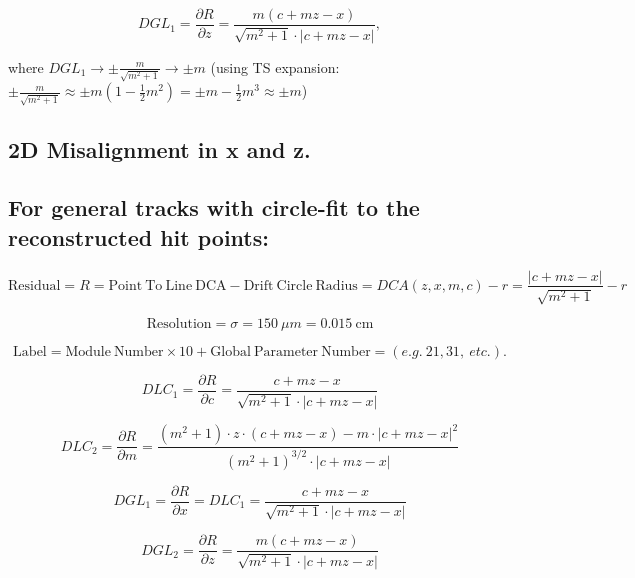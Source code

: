 \documentclass[a4paper,11pt]{article}
\begin{document}
\begin{equation}	
DGL_1 = \frac{\partial R}{\partial z} = \frac{ m(c+mz-x) }  { \sqrt{m^2+1} \cdot |c+mz-x| },
\end{equation}

 where $DGL_1 \rightarrow \pm \frac{m}{\sqrt{m^2+1}} \rightarrow \pm m$
(using TS expansion: $\pm \frac{m}{\sqrt{m^2+1}} \approx \pm m (1-\frac{1}{2}m^2) = \pm m - \frac{1}{2}m^3 \approx \pm m  $)

\clearpage
\subsection{2D Misalignment in x and z.}
\subsection{For general tracks with circle-fit to the reconstructed hit points:}
\begin{equation}	
\mathrm{Residual}= R =\mathrm{Point \ To \ Line \ DCA} - \mathrm{Drift \ Circle \ Radius} = DCA(z,x,m,c) - r = \frac{ |c+mz-x| }  { \sqrt{m^2+1} } -r
\end{equation}

\begin{equation}	
\mathrm{Resolution} = \sigma = 150 \ \mu m = 0.015 \ \mathrm{cm}
\end{equation}

\begin{equation}	
\mathrm{Label}= \mathrm{Module \ Number} \times 10 + \mathrm{Global \ Parameter \ Number} = (e.g. \ 21, 31, \ etc.).
\end{equation}

\begin{equation}
DLC_1 = \frac{\partial R}{\partial c} = \frac{ c+mz-x }  { \sqrt{m^2+1} \cdot |c+mz-x| }
\end{equation}

\begin{equation}
DLC_2 = \frac{ \partial R}{\partial m} = \frac{ (m^2+1)\cdot z\cdot(c+mz-x) - m\cdot |c+mz-x|^2 }{ (m^2+1)^{3/2} \cdot |c+mz-x|  }
\end{equation}

\begin{equation}	
DGL_1 = \frac{\partial R}{\partial x} = DLC_1 = \frac{ c+mz-x }  { \sqrt{m^2+1} \cdot |c+mz-x| }
\end{equation}

\begin{equation}	
DGL_2 = \frac{\partial R}{\partial z} = \frac{ m(c+mz-x) }  { \sqrt{m^2+1} \cdot |c+mz-x| }
\end{equation}
\end{document}
